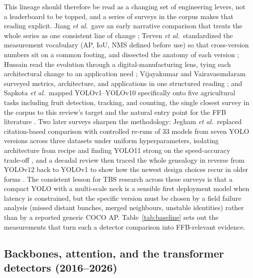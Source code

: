 This lineage should therefore be read as a changing set of engineering levers, not a leaderboard to be topped, and a series of surveys in the corpus makes that reading explicit. Jiang \textit{et al.}\ gave an early narrative comparison that treats the whole series as one consistent line of change \cite{jiang2022yoloreview}; Terven \textit{et al.}\ standardized the measurement vocabulary (AP, IoU, NMS defined before use) so that cross-version numbers sit on a common footing, and dissected the anatomy of each version \cite{terven2023yolo}; Hussain read the evolution through a digital-manufacturing lens, tying each architectural change to an application need \cite{hussain2023yolo}; Vijayakumar and Vairavasundaram surveyed metrics, architecture, and applications in one structured reading \cite{vijayakumar2024yolo}; and Sapkota \textit{et al.}\ mapped YOLOv1--YOLOv10 specifically onto five agricultural tasks including fruit detection, tracking, and counting, the single closest survey in the corpus to this review's target and the natural entry point for the FFB literature \cite{sapkota2024yoloagri}. Two later surveys sharpen the methodology: Jegham \textit{et al.}\ replaced citation-based comparison with controlled re-runs of 33 models from seven YOLO versions across three datasets under uniform hyperparameters, isolating architecture from recipe and finding YOLO11 strong on the speed-accuracy trade-off \cite{alif2024yoloevolution}, and a decadal review then traced the whole genealogy in reverse from YOLOv12 back to YOLOv1 to show how the newest design choices recur in older forms \cite{sapkota2025yologenesis}. The consistent lesson for TBS research across these surveys is that a compact YOLO with a multi-scale neck is a sensible first deployment model when latency is constrained, but the specific version must be chosen by a field failure analysis (missed distant bunches, merged neighbours, unstable identities) rather than by a reported generic COCO AP. Table~\ref{tab:baseline} sets out the measurements that turn such a detector comparison into FFB-relevant evidence.

\subsection{Backbones, attention, and the transformer detectors (2016--2026)}

